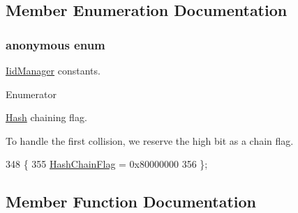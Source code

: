 \subsection{Member Enumeration Documentation}
\subsubsection[{\texorpdfstring{anonymous enum}{anonymous enum}}]{\setlength{\rightskip}{0pt plus 5cm}anonymous enum\hspace{0.3cm}{\ttfamily [private]}}\hypertarget{classns3_1_1IidManager_a111b3e20b0fa2fb672257fa63aca771e}{}\label{classns3_1_1IidManager_a111b3e20b0fa2fb672257fa63aca771e}
\hyperlink{classns3_1_1IidManager}{Iid\+Manager} constants. \begin{Desc}
\item[Enumerator]\par
\begin{description}
\item[{\em 
Hash\+Chain\+Flag\hypertarget{classns3_1_1IidManager_a111b3e20b0fa2fb672257fa63aca771eada8547fce936ccfe8094f1f1f367e53f}{}\label{classns3_1_1IidManager_a111b3e20b0fa2fb672257fa63aca771eada8547fce936ccfe8094f1f1f367e53f}
}]\hyperlink{namespacens3_1_1Hash}{Hash} chaining flag.

To handle the first collision, we reserve the high bit as a chain flag. \end{description}
\end{Desc}

\begin{DoxyCode}
348        \{
355     \hyperlink{classns3_1_1IidManager_a111b3e20b0fa2fb672257fa63aca771eada8547fce936ccfe8094f1f1f367e53f}{HashChainFlag} = 0x80000000
356   \};
\end{DoxyCode}


\subsection{Member Function Documentation}
